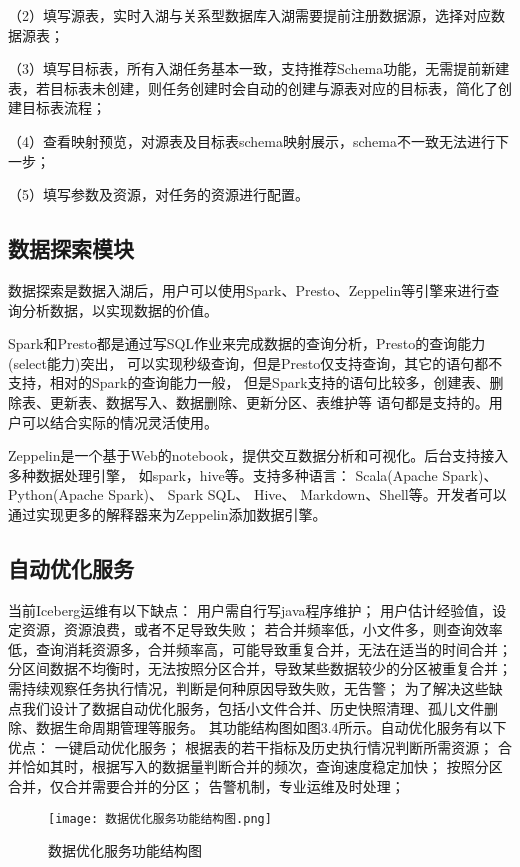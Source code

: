 （2）填写源表，实时入湖与关系型数据库入湖需要提前注册数据源，选择对应数据源表；

（3）填写目标表，所有入湖任务基本一致，支持推荐Schema功能，无需提前新建表，若目标表未创建，则任务创建时会自动的创建与源表对应的目标表，简化了创建目标表流程；

（4）查看映射预览，对源表及目标表schema映射展示，schema不一致无法进行下一步；

（5）填写参数及资源，对任务的资源进行配置。

\subsection{数据探索模块}

数据探索是数据入湖后，用户可以使用Spark、Presto、Zeppelin等引擎来进行查询分析数据，以实现数据的价值。

Spark和Presto都是通过写SQL作业来完成数据的查询分析，Presto的查询能力(select能力)突出，
可以实现秒级查询，但是Presto仅支持查询，其它的语句都不支持，相对的Spark的查询能力一般，
但是Spark支持的语句比较多，创建表、删除表、更新表、数据写入、数据删除、更新分区、表维护等
语句都是支持的。用户可以结合实际的情况灵活使用。

Zeppelin是一个基于Web的notebook，提供交互数据分析和可视化。后台支持接入多种数据处理引擎，
如spark，hive等。支持多种语言： Scala(Apache Spark)、Python(Apache Spark)、
Spark SQL、 Hive、 Markdown、Shell等。开发者可以通过实现更多的解释器来为Zeppelin添加数据引擎。

\subsection{自动优化服务}

当前Iceberg运维有以下缺点：
用户需自行写java程序维护；
用户估计经验值，设定资源，资源浪费，或者不足导致失败；
若合并频率低，小文件多，则查询效率低，查询消耗资源多，合并频率高，可能导致重复合并，无法在适当的时间合并；
分区间数据不均衡时，无法按照分区合并，导致某些数据较少的分区被重复合并；
需持续观察任务执行情况，判断是何种原因导致失败，无告警；
为了解决这些缺点我们设计了数据自动优化服务，包括小文件合并、历史快照清理、孤儿文件删除、数据生命周期管理等服务。
其功能结构图如图3.4所示。自动优化服务有以下优点：
一键启动优化服务；
根据表的若干指标及历史执行情况判断所需资源；
合并恰如其时，根据写入的数据量判断合并的频次，查询速度稳定加快；
按照分区合并，仅合并需要合并的分区；
告警机制，专业运维及时处理；

\begin{figure}[h]
  \centering
  \texttt{[image: 数据优化服务功能结构图.png]}
  \caption{数据优化服务功能结构图}
  \label{fig:badge}
\end{figure}

